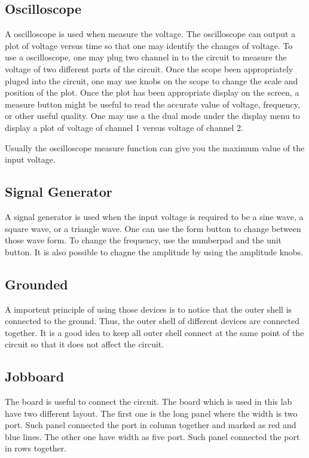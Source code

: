 \documentclass[aps,prl,reprint]{revtex4-1}
\begin{document}
    \subsection{Oscilloscope}
    A oscilloscope is used when measure the voltage. The oscilloscope can output a plot of voltage versus time so that one may identify the changes of voltage. To use a oscilloscope, one may plug two channel in to the circuit to measure the voltage of two different parts of the circuit. Once the scope been appropriately pluged into the circuit, one may use knobs on the scope to change the scale and position of the plot. Once the plot has been appropriate display on the screen, a measure button might be useful to read the accurate value of voltage, frequency, or other useful quality. One may use a the dual mode under the display menu to display a plot of voltage of channel 1 versus voltage of channel 2.

    Usually the oscilloscope measure function can give you the maximum value of the input voltage.

    \subsection{Signal Generator}
    A signal generator is used when the input voltage is required to be a sine wave, a square wave, or a triangle wave. One can use the form button to change between those wave form. To change the frequency, use the numberpad and the unit button. It is also possible to chagne the amplitude by using the amplitude knobs.

    \subsection{Grounded}
    A importent principle of using those devices is to notice that the outer shell is connected to the ground. Thus, the outer shell of different devices are connected together. It is a good idea to keep all outer shell connect at the same point of the circuit so that it does not affect the circuit.

    \subsection{Jobboard}
    The board is useful to connect the circuit. The board which is used in this lab have two different layout. The first one is the long panel where the width is two port. Such panel connected the port in column together and marked as red and blue lines. The other one have width as five port. Such panel connected the port in rows together.
\end{document}
